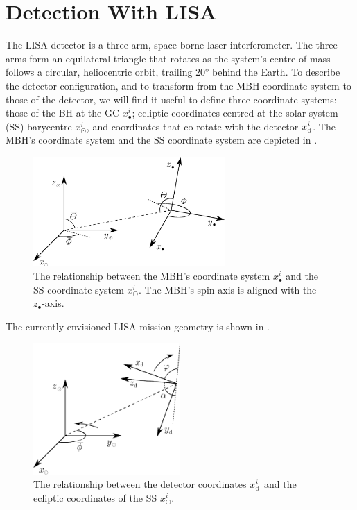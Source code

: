\section{Detection With LISA}

The LISA detector is a three arm, space-borne laser interferometer\cite{Bender1998, Danzmann2003}. The three arms form an equilateral triangle that rotates as the system's centre of mass follows a circular, heliocentric orbit, trailing $\ang{20}$ behind the Earth. To describe the detector configuration, and to transform from the MBH coordinate system to those of the detector, we will find it useful to define three coordinate systems: those of the BH at the GC $x_\bullet^i$; ecliptic coordinates centred at the solar system (SS) barycentre $x_\odot^i$, and coordinates that co-rotate with the detector $x_\mathrm{d}^i$. The MBH's coordinate system and the SS coordinate system are depicted in .
\begin{figure}[tbhp]
\begin{center}
\includegraphics[width=0.65\textwidth]{./Images/BH_SS.eps}
    \caption{The relationship between the MBH's coordinate system $x_\bullet^i$ and the SS coordinate system $x_\odot^i$. The MBH's spin axis is aligned with the $z_\bullet$-axis.}
   \label{fig:BH_SS}
\end{center}
\end{figure}
The currently envisioned LISA mission geometry is shown in .
\begin{figure}[htbp]
\begin{center}
\includegraphics[width=0.5\textwidth]{./Images/SS_LISA.eps}
    \caption{The relationship between the detector coordinates $x_\mathrm{d}^i$ and the ecliptic coordinates of the SS $x_\odot^i$\cite{Bender1998}.}
   \label{fig:SS_LISA}
\end{center}
\end{figure}
